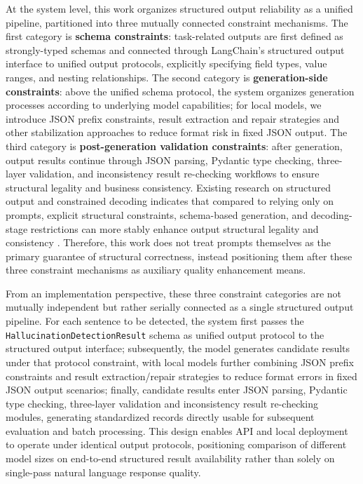 \documentclass[11pt]{article}
\begin{document}
At the system level, this work organizes structured output reliability as a unified pipeline, partitioned into three mutually connected constraint mechanisms. The first category is \textbf{schema constraints}: task-related outputs are first defined as strongly-typed schemas and connected through LangChain's structured output interface to unified output protocols, explicitly specifying field types, value ranges, and nesting relationships. The second category is \textbf{generation-side constraints}: above the unified schema protocol, the system organizes generation processes according to underlying model capabilities; for local models, we introduce JSON prefix constraints, result extraction and repair strategies and other stabilization approaches to reduce format risk in fixed JSON output. The third category is \textbf{post-generation validation constraints}: after generation, output results continue through JSON parsing, Pydantic type checking, three-layer validation, and inconsistency result re-checking workflows to ensure structural legality and business consistency. Existing research on structured output and constrained decoding indicates that compared to relying only on prompts, explicit structural constraints, schema-based generation, and decoding-stage restrictions can more stably enhance output structural legality and consistency \citep{liu2024structuredOutputBenchmark,lu2025schemaReinforcementLearning,geng2023grammarConstrainedDecoding}. Therefore, this work does not treat prompts themselves as the primary guarantee of structural correctness, instead positioning them after these three constraint mechanisms as auxiliary quality enhancement means.

From an implementation perspective, these three constraint categories are not mutually independent but rather serially connected as a single structured output pipeline. For each sentence to be detected, the system first passes the \texttt{HallucinationDetectionResult} schema as unified output protocol to the structured output interface; subsequently, the model generates candidate results under that protocol constraint, with local models further combining JSON prefix constraints and result extraction/repair strategies to reduce format errors in fixed JSON output scenarios; finally, candidate results enter JSON parsing, Pydantic type checking, three-layer validation and inconsistency result re-checking modules, generating standardized records directly usable for subsequent evaluation and batch processing. This design enables API and local deployment to operate under identical output protocols, positioning comparison of different model sizes on end-to-end structured result availability rather than solely on single-pass natural language response quality.
\end{document}
